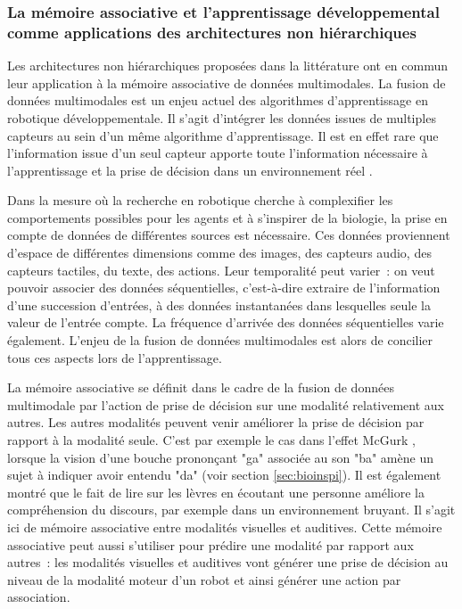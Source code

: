\documentclass[../main]{subfiles}
\begin{document}
\subsubsection{La mémoire associative et l'apprentissage développemental comme applications des architectures non hiérarchiques}

Les architectures non hiérarchiques proposées dans la littérature ont en commun leur application à la mémoire associative de données multimodales.
La fusion de données multimodales est un enjeu actuel des algorithmes d'apprentissage en robotique développementale.
Il s'agit d'intégrer les données issues de multiples capteurs au sein d'un même algorithme d'apprentissage.
Il est en effet rare que l'information issue d'un seul capteur apporte toute l'information nécessaire à l'apprentissage et la prise de décision dans un environnement réel \parencite{lahat2015}. 

Dans la mesure où la recherche en robotique cherche à complexifier les comportements possibles pour les agents et à s'inspirer de la biologie, la prise en compte de données de différentes sources est nécessaire. Ces données proviennent d'espace de différentes dimensions comme des images, des capteurs audio, des capteurs tactiles, du texte, des actions. Leur temporalité peut varier~: on veut pouvoir associer des données séquentielles, c'est-à-dire extraire de l'information d'une succession d'entrées, à des données instantanées dans lesquelles seule la valeur de l'entrée compte. La fréquence d'arrivée des données séquentielles varie également.
L'enjeu de la fusion de données multimodales est alors de concilier tous ces aspects lors de l'apprentissage.

La mémoire associative se définit dans le cadre de la fusion de données multimodale par l'action de prise de décision sur une modalité relativement aux autres.
Les autres modalités peuvent venir améliorer la prise de décision par rapport à la modalité seule. C'est par exemple le cas dans l'effet McGurk \parencite{McGurk1976HearingLA}, lorsque la vision d'une bouche prononçant "ga" associée au son "ba" amène un sujet à indiquer avoir entendu "da" (voir section \ref{sec:bioinspi}). Il est également montré que le fait de lire sur les lèvres en écoutant une personne améliore la compréhension du discours, par exemple dans un environnement bruyant. Il s'agit ici de mémoire associative entre modalités visuelles et auditives.
Cette mémoire associative peut aussi s'utiliser pour prédire une modalité par rapport aux autres~: les modalités visuelles et auditives vont générer une prise de décision au niveau de la modalité moteur d'un robot et ainsi générer une action par association.
\end{document}
